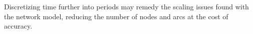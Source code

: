 Discretizing time further into periods may remedy the scaling issues found with the network model, reducing the number of nodes and arcs at the cost of accuracy.